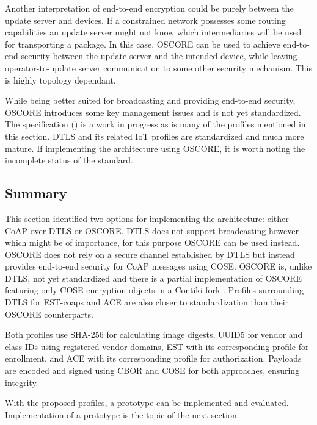 \documentclass[0-thesis.tex]{subfiles}
\begin{document}
Another interpretation of end-to-end encryption could be purely between the update server
and devices. If a constrained network possesses some routing capabilities an update server
might not know which intermediaries will be used for transporting a package. In this case,
OSCORE can be used to achieve end-to-end security between the update server and the
intended device, while leaving operator-to-update server communication to some other
security mechanism. This is highly topology dependant.

While being better suited for broadcasting and providing end-to-end security, OSCORE
introduces some key management issues and is not yet standardized. The specification
(\parencite{oscore}) is a work in progress as is many of the profiles mentioned in this
section. DTLS and its related IoT profiles are standardized and much more mature. If
implementing the architecture using OSCORE, it is worth noting the incomplete status of
the standard.

\subsection{Summary}
\label{ssec:profiles-summary}
This section identified two options for implementing the architecture: either CoAP over
DTLS or OSCORE. DTLS does not support broadcasting however which might be of importance,
for this purpose OSCORE can be used instead. OSCORE does not rely on a secure channel
established by DTLS but instead provides end-to-end security for CoAP messages using COSE.
OSCORE is, unlike DTLS, not yet standardized and there is a partial implementation of
OSCORE featuring only COSE encryption objects in a Contiki fork
\parencite{contiki-oscore}. Profiles surrounding DTLS for EST-coaps and ACE are also
closer to standardization than their OSCORE counterparts.

Both profiles use SHA-256 for calculating image digests, UUID5 for vendor and class IDs
using registered vendor domains, EST with its corresponding profile for enrollment, and
ACE with its corresponding profile for authorization. Payloads are encoded and signed
using CBOR and COSE for both approaches, ensuring integrity.

With the proposed profiles, a prototype can be implemented and evaluated. Implementation
of a prototype is the topic of the next section.
\end{document}
